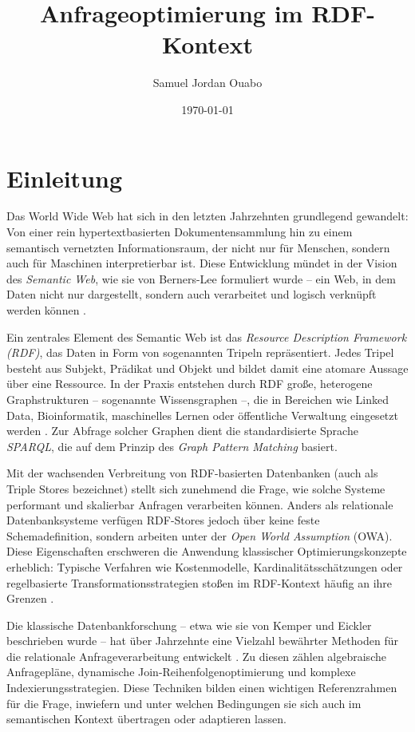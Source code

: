 \documentclass[12pt]{article}
\title{Anfrageoptimierung im RDF-Kontext}
\author{Samuel Jordan Ouabo}
\date{\today}
\begin{document}
\maketitle
\tableofcontents
\newpage

\section{Einleitung}

Das World Wide Web hat sich in den letzten Jahrzehnten grundlegend gewandelt: Von einer rein hypertextbasierten Dokumentensammlung hin zu einem semantisch vernetzten Informationsraum, der nicht nur für Menschen, sondern auch für Maschinen interpretierbar ist. Diese Entwicklung mündet in der Vision des \textit{Semantic Web}, wie sie von Berners-Lee formuliert wurde – ein Web, in dem Daten nicht nur dargestellt, sondern auch verarbeitet und logisch verknüpft werden können \cite{berners2001semantic}.

Ein zentrales Element des Semantic Web ist das \textit{Resource Description Framework (RDF)}, das Daten in Form von sogenannten Tripeln repräsentiert. Jedes Tripel besteht aus Subjekt, Prädikat und Objekt und bildet damit eine atomare Aussage über eine Ressource. In der Praxis entstehen durch RDF große, heterogene Graphstrukturen – sogenannte Wissensgraphen –, die in Bereichen wie Linked Data, Bioinformatik, maschinelles Lernen oder öffentliche Verwaltung eingesetzt werden \cite{hogan2021knowledge}. Zur Abfrage solcher Graphen dient die standardisierte Sprache \textit{SPARQL}, die auf dem Prinzip des \textit{Graph Pattern Matching} basiert.

Mit der wachsenden Verbreitung von RDF-basierten Datenbanken (auch als Triple Stores bezeichnet) stellt sich zunehmend die Frage, wie solche Systeme performant und skalierbar Anfragen verarbeiten können. Anders als relationale Datenbanksysteme verfügen RDF-Stores jedoch über keine feste Schemadefinition, sondern arbeiten unter der \textit{Open World Assumption} (OWA). Diese Eigenschaften erschweren die Anwendung klassischer Optimierungskonzepte erheblich: Typische Verfahren wie Kostenmodelle, Kardinalitätsschätzungen oder regelbasierte Transformationsstrategien stoßen im RDF-Kontext häufig an ihre Grenzen \cite{wylot2018rdf, ycy2015}.

Die klassische Datenbankforschung – etwa wie sie von Kemper und Eickler beschrieben wurde – hat über Jahrzehnte eine Vielzahl bewährter Methoden für die relationale Anfrageverarbeitung entwickelt \cite{kemper2022datenbanksysteme}. Zu diesen zählen algebraische Anfragepläne, dynamische Join-Reihenfolgenoptimierung und komplexe Indexierungsstrategien. Diese Techniken bilden einen wichtigen Referenzrahmen für die Frage, inwiefern und unter welchen Bedingungen sie sich auch im semantischen Kontext übertragen oder adaptieren lassen.
\end{document}
